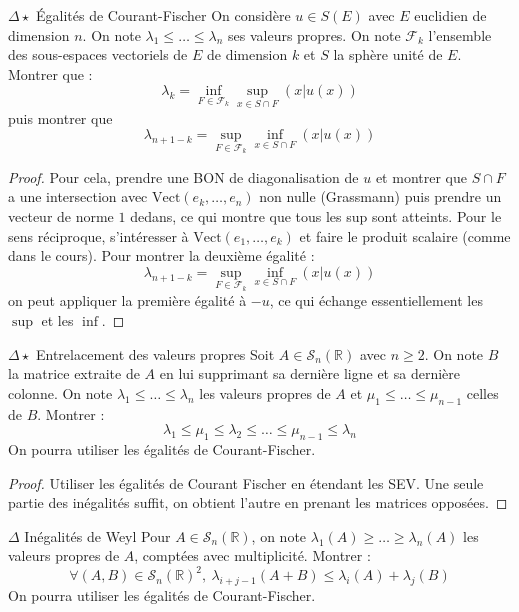\documentclass[french,a4paper]{article}
\newcommand{\R}{\mathbb{R}}
\theoremstyle{plain}
\theoremstyle{definition}
\theoremstyle{remark}
\begin{document}
\begin{ex}{$\Delta\star$ Égalités de Courant-Fischer}
	On considère $u\in S(E)$ avec $E$ euclidien de dimension $n$. On note $\lambda_1\leqslant\ldots\leqslant\lambda_n$ ses valeurs propres. On note $\mathcal{F}_k$ l'ensemble des sous-espaces vectoriels de $E$ de dimension $k$ et $S$ la sphère unité de $E$. Montrer que :  $$\lambda_k=\inf_{F\in\mathcal{F}_k}\sup_{x\in S\cap F}(x|u(x))$$ puis montrer que $$\lambda_{n+1-k}=\sup_{F\in\mathcal{F}_k}\inf_{x\in S\cap F}(x|u(x))$$
\end{ex}
\begin{proof}
	Pour cela, prendre une BON de diagonalisation de $u$ et montrer que $S\cap F$ a une intersection avec $\text{Vect}(e_k,\ldots,e_n)$ non nulle (Grassmann) puis prendre un vecteur de norme $1$ dedans, ce qui montre que tous les sup sont atteints. Pour le sens réciproque, s'intéresser à $\text{Vect}(e_1,\ldots,e_k)$ et faire le produit scalaire (comme dans le cours). Pour montrer la deuxième égalité : $$\lambda_{n+1-k}=\sup_{F\in \mathcal{F}_k}\inf_{x\in S\cap F}(x|u(x))$$ on peut appliquer la première égalité à $-u$, ce qui échange essentiellement les $\sup$ et les $\inf$.
\end{proof}

\begin{ex}{$\Delta\star$ Entrelacement des valeurs propres}
	Soit $A\in\mathcal{S}_n(\R)$ avec $n\geqslant 2$. On note $B$ la matrice extraite de $A$ en lui supprimant sa dernière ligne et sa dernière colonne. On note $\lambda_1\leqslant\ldots\leqslant\lambda_n$ les valeurs propres de $A$ et $\mu_1\leqslant\ldots\leqslant\mu_{n-1}$ celles de $B$. Montrer : $$\lambda_1\leqslant\mu_1\leqslant\lambda_2\leqslant\ldots\leqslant\mu_{n-1}\leqslant\lambda_n$$ On pourra utiliser les égalités de Courant-Fischer.
\end{ex}
\begin{proof}
	Utiliser les égalités de Courant Fischer en étendant les SEV. Une seule partie des inégalités suffit, on obtient l'autre en prenant les matrices opposées.
\end{proof}

\begin{ex}{$\Delta$ Inégalités de Weyl}
	Pour $A\in\mathcal{S}_n(\R)$, on note $\lambda_1(A)\geqslant\ldots\geqslant\lambda_n(A)$ les valeurs propres de $A$, comptées avec multiplicité. Montrer : $$\forall (A,B)\in\mathcal{S}_n(\R)^2,\ \lambda_{i+j-1}(A+B)\leqslant\lambda_i(A)+\lambda_j(B)$$
	On pourra utiliser les égalités de Courant-Fischer.
\end{ex}
\end{document}
